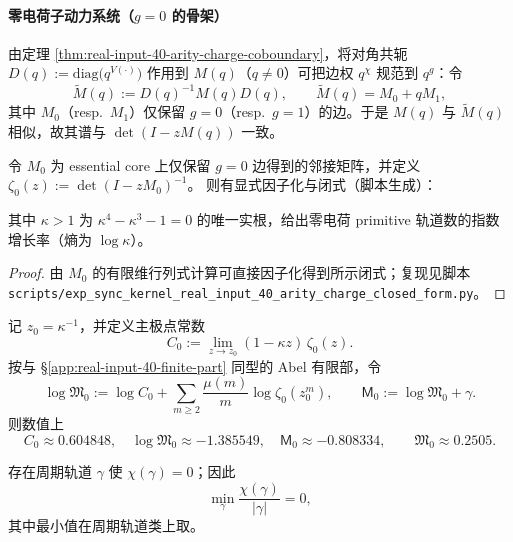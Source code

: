 \paragraph{零电荷子动力系统（$g=0$ 的骨架）}
由定理 \ref{thm:real-input-40-arity-charge-coboundary}，将对角共轭
\(
D(q):=\mathrm{diag}\bigl(q^{V(\cdot)}\bigr)
\)
作用到 $M(q)$（$q\neq 0$）可把边权 $q^{\chi}$ 规范到 $q^{g}$：令
\[
\widetilde M(q):=D(q)^{-1}M(q)D(q),
\qquad
\widetilde M(q)=M_0+qM_1,
\]
其中 $M_0$（resp.\ $M_1$）仅保留 $g=0$（resp.\ $g=1$）的边。于是 $M(q)$ 与 $\widetilde M(q)$ 相似，故其谱与 $\det(I-zM(q))$ 一致。

\begin{proposition}\label{prop:real-input-40-arity-charge-zero-zeta}
令 $M_0$ 为 essential core 上仅保留 $g=0$ 边得到的邻接矩阵，并定义
\(
\zeta_0(z):=\det(I-zM_0)^{-1}
\)。
则有显式因子化与闭式（脚本生成）：

其中 $\kappa>1$ 为 $\kappa^4-\kappa^3-1=0$ 的唯一实根，给出零电荷 primitive 轨道数的指数增长率（熵为 $\log\kappa$）。
\end{proposition}

\begin{proof}
由 $M_0$ 的有限维行列式计算可直接因子化得到所示闭式；复现见脚本
\texttt{scripts/exp\_sync\_kernel\_real\_input\_40\_arity\_charge\_closed\_form.py}。
\end{proof}

\begin{proposition}\label{prop:real-input-40-arity-charge-zero-constants}
记 $z_0=\kappa^{-1}$，并定义主极点常数
\[
C_0:=\lim_{z\to z_0}(1-\kappa z)\,\zeta_0(z).
\]
按与 \S\ref{app:real-input-40-finite-part} 同型的 Abel 有限部，令
\[
\log\mathfrak{M}_0:=\log C_0+\sum_{m\ge 2}\frac{\mu(m)}{m}\log\zeta_0(z_0^m),
\qquad
\mathsf{M}_0:=\log\mathfrak{M}_0+\gamma.
\]
则数值上
\[
C_0\approx 0.604848,\quad
\log\mathfrak{M}_0\approx -1.385549,\quad
\mathsf{M}_0\approx -0.808334,
\qquad
\mathfrak{M}_0\approx 0.2505.
\]
\end{proposition}

\begin{corollary}\label{cor:real-input-40-arity-charge-min-average}
存在周期轨道 $\gamma$ 使 $\chi(\gamma)=0$；因此
\[
\min_{\gamma}\frac{\chi(\gamma)}{|\gamma|}=0,
\]
其中最小值在周期轨道类上取。
\end{corollary}

